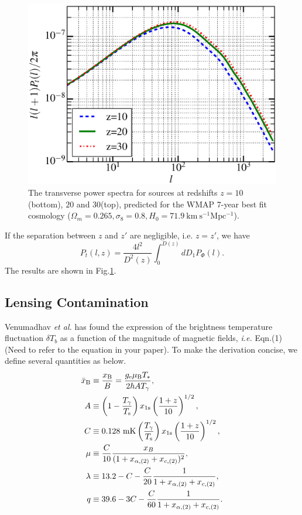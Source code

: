 \documentclass[aps,prd,twocolumn,floatfix,showpacs,superscriptaddress,nofootinbib]{revtex4-1}
\newcommand{\ie}{{\it i.e. }}
\newcommand{\etal}{{\it et al. }}
\begin{document}
\begin{figure}
\centering
\includegraphics[scale=0.45]{pt_2.eps}
\caption{The transverse power spectra for sources at redshifts $z=10$(bottom), $20$ and $30$(top), predicted for the WMAP 7-year best fit cosmology ($\Omega_m=0.265,\sigma_8=0.8,H_0=71.9\ \mathrm{km\ s^{-1}Mpc^{-1}}$).}
\label{Pt}
\end{figure}

If the separation between $z$ and $z'$ are negligible, i.e. $z=z'$, we have
\begin{equation}
P_t(l,z)=\frac{4l^2}{D^2(z)}\int_0^{D(z)}dD_1P_{\Phi}(l).
\end{equation}
The results are shown in Fig.\ref{Pt}.

\subsection{Lensing Contamination}
Venumadhav \etal\cite{Venumadhav:2014tqa} has found the expression of the brightness temperature fluctuation $\delta T_b$ as a function of the magnitude of magnetic fields, \ie Eqn.(1){\color{red} (Need to refer to the equation in your paper)}. To make the derivation concise, we define several quantities as below.
\begin{align}
\bar{x}_{\rm B}&\equiv\frac{x_{\rm B}}{B} = \frac{g_{\rm e} \mu_{\rm B} T_*}{2 \hbar A T_\gamma},\\
A&\equiv\left( 1 - \frac{T_\gamma}{T_{\rm s}} \right) x_{1{\rm s}} \left( \frac{1+z}{10} \right)^{1/2},\\
C&\equiv0.128 \ {\rm mK} \left( \frac{T_\gamma}{T_{\rm s}} \right) x_{1{\rm s}} \left( \frac{1+z}{10} \right)^{1/2},\\
\mu&\equiv\frac{C}{10}\frac{x_B}{(1+x_{\alpha,(2)}+x_{c,(2)})^2},\\
\lambda&\equiv 13.2-C-\frac{C}{20}\frac{1}{1+x_{\alpha,(2)}+x_{c,(2)}},\\
q&\equiv 39.6-3C-\frac{C}{60}\frac{1}{1+x_{\alpha,(2)}+x_{c,(2)}}.
\end{align}
\end{document}
